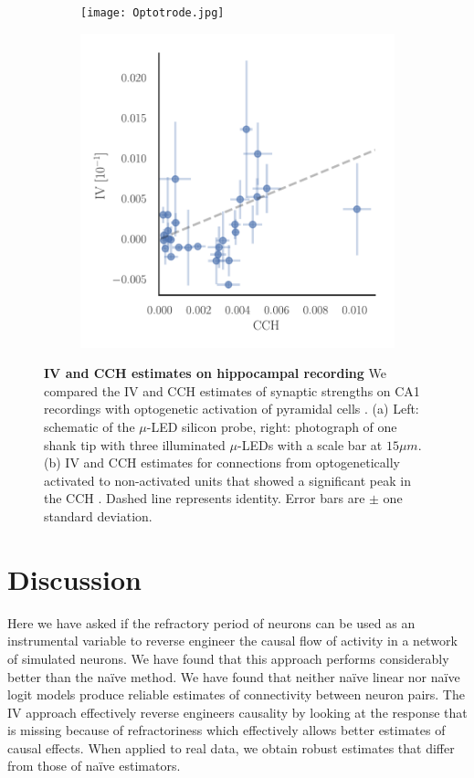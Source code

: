 \documentclass[11pt]{article}
\begin{document}
\begin{figure}
\makeatletter
\renewcommand\p@subfigure{}
\makeatother
\begin{subfigure}{0.4\textwidth}
\texttt{[image: Optotrode.jpg]}
\caption{} \label{}
\end{subfigure}\hfill
\begin{subfigure}{0.6\textwidth}
\includegraphics[width=1.\textwidth]{Optodata_comparisonIV_CCH.pdf}
\caption{} \label{}
\end{subfigure}
\caption{\textbf{IV and CCH estimates on hippocampal recording}
We compared the IV and CCH estimates of synaptic strengths on CA1 recordings with optogenetic activation of pyramidal cells \citep{English2017}.
(a) Left: schematic of the $\mu$-LED silicon probe, right: photograph of one shank tip with three illuminated $\mu$-LEDs with a scale bar at $15 \mu m$.
(b) IV and CCH estimates for connections from optogenetically activated to non-activated units that showed a significant peak in the CCH \citep{English2017}.
Dashed line represents identity. 
Error bars are $ \pm $ one standard deviation.
}
\label{fig:optodata}
 \end{figure}
\FloatBarrier
\section{Discussion}
Here we have asked if the refractory period of neurons can be used as an instrumental variable to reverse engineer the causal flow of activity in a network of simulated neurons. 
We have found that this approach performs considerably better than the na\"ive method. 
We have found that neither na\"ive linear nor na\"ive logit models produce reliable estimates of connectivity between neuron pairs. 
The IV approach effectively reverse engineers causality by looking at the response that is missing because of refractoriness which effectively allows better estimates of causal effects. When applied to real data, we obtain robust estimates that differ from those of na\"ive estimators.
\end{document}
